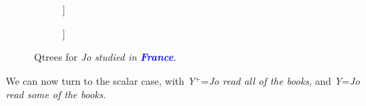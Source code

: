	\begin{figure}[H]
		\centering
		\begin{subfigure}[b]{.3\linewidth}
			\centering
			\begin{forest}
				[CS[\bfbox{France}][$\neg$France]]
			\end{forest}
			\caption{}\label{tree:france-polar}
		\end{subfigure}
		\qquad
		\begin{subfigure}[b]{.3\linewidth}
			\centering
			\begin{forest}
				[CS[\bfbox{France}][UK][...]]
			\end{forest}
			\caption{}\label{tree:france-wh}
		\end{subfigure}
		\caption{Qtrees for \textit{Jo studied in \textbf{\textcolor{blue}{France}}}.}
	\end{figure}
	
	We can now turn to the scalar case, with \textit{Y}$^+$=\textit{Jo read all of the books}, and \textit{Y}=\textit{Jo read some of the books}.
	
